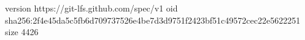 version https://git-lfs.github.com/spec/v1
oid sha256:2f4e45da5c5fb6d709737526e4be7d3d9751f2423bf51c49572cec22e5622251
size 4426
